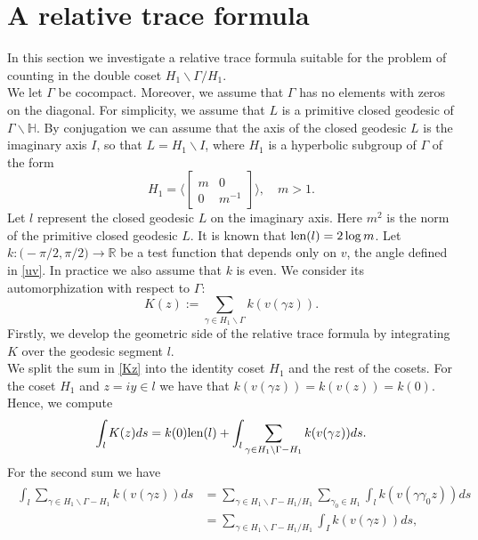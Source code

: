 \documentclass[a4paper,11pt]{amsart}
\theoremstyle{definition}
\begin{document}
\section{A relative trace formula}\label{A relative trace formula}
In this section we investigate a relative trace formula suitable for the problem of counting in the double coset $H_1 \backslash \Gamma / H_1$. \\
We let $\Gamma$ be cocompact. Moreover, we assume that $\Gamma$ has no elements with zeros on the diagonal. For simplicity, we assume that $L$ is a primitive closed geodesic of $\Gamma \backslash\mathbb{H}$. By conjugation we can assume that the axis of the closed geodesic $L$ is the imaginary axis $I$, so that $L= H_1\backslash I$, where $H_1$ is a hyperbolic subgroup of $\Gamma$ of the form 
$$ H_1 =  \Biggl \langle \begin{bmatrix}
m & 0 \\
0 & m^{-1}
\end{bmatrix} \Biggr \rangle, \quad m>1. $$ 
Let $l$ represent the closed geodesic $L$ on the imaginary axis. Here $m^2$ is the norm of the primitive closed geodesic $L$.
It is known that $\hbox{len}(l)=2\log m$. Let $k:\big(-\pi/2,\pi/2\big) \rightarrow \mathbb{R}$ be a test function that depends only on $v$, the angle defined in \eqref{uv}. In practice we also assume that $k$ is even. We consider its automorphization with respect to $\Gamma$:
\begin{equation}\label{Kz}
    K(z):= \sum_{\gamma \in H_1 \backslash \Gamma} k(v(\gamma z)).
\end{equation}
Firstly, we develop the geometric side of the relative trace formula by integrating $K$ over the geodesic segment $l$. \\
We split the sum in \eqref{Kz} into the identity coset $H_1$ and the rest of the cosets. For the coset $H_1$ and $z=iy \in l$ we have that $k(v(\gamma z))=k(v(z))=k(0)$. Hence, we compute
\begin{equation}\label{k0}
    \int_{l} K(z)ds= k(0)\hbox{len}(l) + \int_{l} \sum_{\gamma \in H_1 \backslash \Gamma-H_1} k(v(\gamma z))ds.
\end{equation}
For the second sum we have
\begin{align}\label{geK}
    \begin{split}
        \int_{l} \sum_{\gamma \in H_1 \backslash \Gamma-H_1} k(v(\gamma z))ds &= \sum_{\gamma \in H_1\backslash \Gamma - H_1 /H_1} \sum_{\gamma_0 \in H_1} \int_lk(v(\gamma \gamma_0 z))ds \\
        &= \sum_{\gamma \in H_1\backslash \Gamma - H_1 /H_1} \int_I{k(v(\gamma z))ds},
    \end{split}
\end{align}
\end{document}
